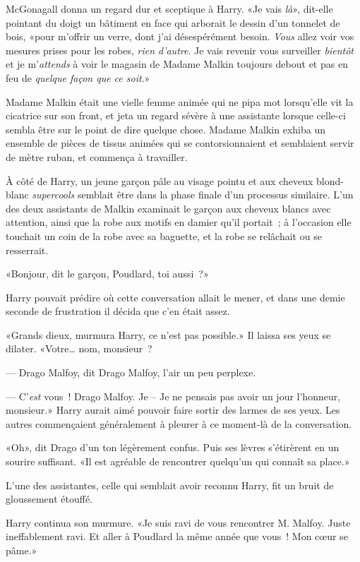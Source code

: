 McGonagall donna un regard dur et sceptique à Harry. «Je vais \emph{là}», dit-elle pointant du doigt un bâtiment en face qui arborait le dessin d'un tonnelet de bois, «pour m'offrir un verre, dont j'ai désespérément besoin. \emph{Vous} allez voir vos mesures prises pour les robes, \emph{rien d'autre}. Je vais revenir vous surveiller \emph{bientôt} et je m'\emph{attends} à voir le magasin de Madame Malkin toujours debout et pas en feu de \emph{quelque façon que ce soit}.»

Madame Malkin était une vielle femme animée qui ne pipa mot lorsqu'elle vit la cicatrice sur son front, et jeta un regard sévère à une assistante lorsque celle-ci sembla être sur le point de dire quelque chose. Madame Malkin exhiba un ensemble de pièces de tissus animées qui se contorsionnaient et semblaient servir de mètre ruban, et commença à travailler.

À côté de Harry, un jeune garçon pâle au visage pointu et aux cheveux blond-blanc \emph{supercools} semblait être dans la phase finale d'un processus similaire. L'un des deux assistants de Malkin examinait le garçon aux cheveux blancs avec attention, ainsi que la robe aux motifs en damier qu'il portait~; à l'occasion elle touchait un coin de la robe avec sa baguette, et la robe se relâchait ou se resserrait.

«Bonjour, dit le garçon, Poudlard, toi aussi~?»

Harry pouvait prédire où cette conversation allait le mener, et dans une demie seconde de frustration il décida que c'en était assez.

«Grands dieux, murmura Harry, ce n'est pas possible.» Il laissa ses yeux se dilater. «Votre… nom, monsieur~?

--- Drago Malfoy, dit Drago Malfoy, l'air un peu perplexe.

--- C'\emph{est} vous~! Drago Malfoy. Je -- Je ne pensais pas avoir un jour l'honneur, monsieur.» Harry aurait aimé pouvoir faire sortir des larmes de ses yeux. Les autres commençaient généralement à pleurer à ce moment-là de la conversation.

«Oh», dit Drago d'un ton légèrement confus. Puis ses lèvres s'étirèrent en un sourire suffisant. «Il est agréable de rencontrer quelqu'un qui connaît sa place.»

L'une des assistantes, celle qui semblait avoir reconnu Harry, fit un bruit de gloussement étouffé.

Harry continua son murmure. «Je suis ravi de vous rencontrer M. Malfoy. Juste ineffablement ravi. Et aller à Poudlard la même année que vous~! Mon cœur se pâme.»

